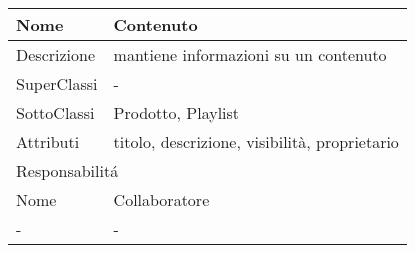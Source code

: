 




\begin{center} %
    \begin{longtable}{ |p{3cm}|p{3cm}|p{3cm}|p{3cm}| }
        \hline
        Nome & \multicolumn{3}{|p{9cm}|}{Contenuto} \\\hline
        Descrizione & \multicolumn{3}{|p{9cm}|}{mantiene informazioni su un contenuto} \\\hline
        SuperClassi & \multicolumn{3}{|p{9cm}|}{-} \\\hline
        SottoClassi & \multicolumn{3}{|p{9cm}|}{Prodotto, Playlist} \\\hline
        Attributi & \multicolumn{3}{|p{9cm}|}{titolo, descrizione, visibilità, proprietario} \\\hline
        \multicolumn{4}{|p{12cm}|}{Responsabilit\'a} \\\hline %
        \multicolumn{2}{|p{6cm}|}{Nome} & \multicolumn{2}{|p{6cm}|}{Collaboratore} \\\hline
        \multicolumn{2}{|p{6cm}|}{-} & \multicolumn{2}{|p{6cm}|}{-} \\\hline
    \end{longtable}
\end{center}


